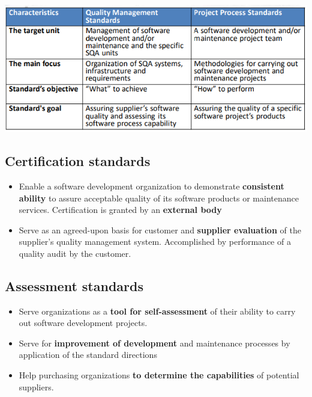 \documentclass{article}
\begin{document}
\begin{center}
  \includegraphics[scale=0.8]{sqa_classes.png}
\end{center}

\subsection{Certification standards}
\begin{itemize}
  \item Enable a software development organization to demonstrate \textbf{consistent ability} to assure acceptable quality of its software products or maintenance services. Certification is granted by an \textbf{external body}
  \item Serve as an agreed-upon basis for customer and \textbf{supplier evaluation} of the supplier’s quality management system. Accomplished by performance of a quality audit by the customer.
\end{itemize}

\subsection{Assessment standards}

\begin{itemize}
  \item Serve organizations as a \textbf{tool for self-assessment} of their ability to carry out software development projects.
  \item Serve for \textbf{improvement of development} and maintenance processes by application of the standard directions
  \item Help purchasing organizations \textbf{to determine the capabilities} of potential suppliers.
\end{itemize}
\end{document}
